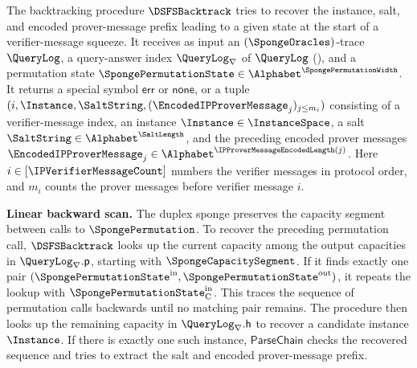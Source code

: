 \begin{definition}[BackTrack]
\label{def:dsfs_backtrack}
\leanok
{}
The backtracking procedure \(\DSFSBacktrack\) tries to recover the instance, salt, and encoded prover-message prefix leading to a given state at the start of a verifier-message squeeze. It receives as input an \((\SpongeOracles)\)-trace \(\QueryLog\), a query-answer index \(\QueryLog_{\nabla}\) of \(\QueryLog\) (), and a permutation state \(\SpongePermutationState\in\Alphabet^{\SpongePermutationWidth}\). It returns a special symbol \(\mathsf{err}\) or \(\mathsf{none}\), or a tuple \((i,\Instance,\SaltString,(\EncodedIPProverMessage_j)_{j\le m_i})\) consisting of a verifier-message index, an instance \(\Instance\in\InstanceSpace\), a salt \(\SaltString\in\Alphabet^{\SaltLength}\), and the preceding encoded prover messages \(\EncodedIPProverMessage_j\in\Alphabet^{\IPProverMessageEncodedLength(j)}\). Here \(i\in[\IPVerifierMessageCount]\) numbers the verifier messages in protocol order, and \(m_i\) counts the prover messages before verifier message \(i\).

\medskip\noindent\textbf{Linear backward scan.}
The duplex sponge preserves the capacity segment between calls to \(\SpongePermutation\). To recover the preceding permutation call, \(\DSFSBacktrack\) looks up the current capacity among the output capacities in \(\QueryLog_{\nabla}.\mathsf p\), starting with \(\SpongeCapacitySegment\). If it finds exactly one pair \((\SpongePermutationState^{\mathrm{in}},\SpongePermutationState^{\mathrm{out}})\), it repeats the lookup with \(\SpongePermutationState^{\mathrm{in}}_{\mathrm C}\). This traces the sequence of permutation calls backwards until no matching pair remains. The procedure then looks up the remaining capacity in \(\QueryLog_{\nabla}.\mathsf h\) to recover a candidate instance \(\Instance\). If there is exactly one such instance, \(\mathsf{ParseChain}\) checks the recovered sequence and tries to extract the salt and encoded prover-message prefix.


\end{definition}
